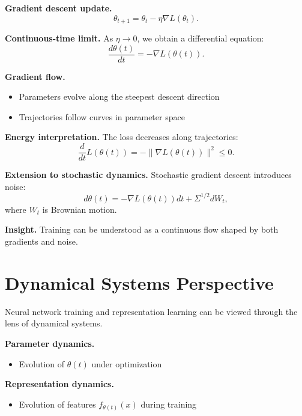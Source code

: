 \medskip

\noindent
\textbf{Gradient descent update.}
\[
\theta_{t+1} = \theta_t - \eta \nabla L(\theta_t).
\]

\medskip

\noindent
\textbf{Continuous-time limit.}  
As $\eta \to 0$, we obtain a differential equation:
\[
\frac{d\theta(t)}{dt} = -\nabla L(\theta(t)).
\]

\medskip

\noindent
\textbf{Gradient flow.}
\begin{itemize}
    \item Parameters evolve along the steepest descent direction
    \item Trajectories follow curves in parameter space
\end{itemize}

\medskip

\noindent
\textbf{Energy interpretation.}  
The loss decreases along trajectories:
\[
\frac{d}{dt} L(\theta(t)) = -\|\nabla L(\theta(t))\|^2 \leq 0.
\]

\medskip

\noindent
\textbf{Extension to stochastic dynamics.}  
Stochastic gradient descent introduces noise:
\[
d\theta(t) = -\nabla L(\theta(t)) dt + \Sigma^{1/2} dW_t,
\]
where $W_t$ is Brownian motion.

\medskip

\noindent
\textbf{Insight.}  
Training can be understood as a continuous flow shaped by both gradients and noise.

\section{Dynamical Systems Perspective}

Neural network training and representation learning can be viewed through the lens of dynamical systems.

\medskip

\noindent
\textbf{Parameter dynamics.}
\begin{itemize}
    \item Evolution of $\theta(t)$ under optimization
\end{itemize}

\medskip

\noindent
\textbf{Representation dynamics.}
\begin{itemize}
    \item Evolution of features $f_{\theta(t)}(x)$ during training
\end{itemize}

